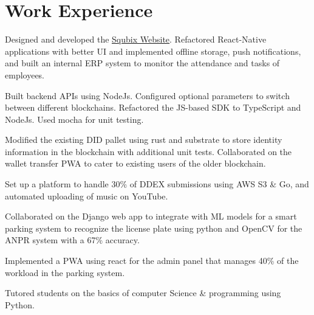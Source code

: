 \documentclass[]{assets/deedy-resume-openfont}
\begin{document}
  \section{Work Experience}
  \hfill {}
      \begin{tightemize}
       \item Designed and developed the {\href{https://squbix.com/}{ \underline{Squbix Website}}}. Refactored React-Native applications with better UI and implemented offline storage, push notifications, and built an internal ERP system to monitor the attendance and tasks of employees.
       \item Built backend APIs using NodeJs. Configured optional parameters to switch between different blockchains. Refactored the JS-based SDK to TypeScript and NodeJs. Used mocha for unit testing.
       \item Modified the existing DID pallet using rust and substrate to store identity information in the blockchain with additional unit tests. Collaborated on the wallet transfer PWA to cater to existing users of the older blockchain.
      \end{tightemize}
      \sectionsep
  \hfill {}
      \begin{tightemize}
    \item Set up a platform to handle 30\% of DDEX submissions using AWS S3 \& Go, and automated uploading of music on YouTube.
\end{tightemize}
      \sectionsep
  \hfill {}
      \begin{tightemize}
    \item Collaborated on the Django web app to integrate with ML models for a smart parking system to recognize the license plate using python and OpenCV for the ANPR system with a 67\% accuracy.
    \item Implemented a PWA using react for the admin panel that manages 40\% of the workload in the parking system.
\end{tightemize}
      \sectionsep
      \hfill {}
      \begin{tightemize}
    \item Tutored students on the basics of computer Science \& programming using Python.
    \end{tightemize}
      \sectionsep
%
%
\end{document}
